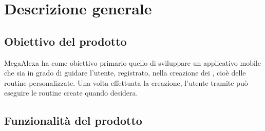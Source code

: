 \section{Descrizione generale}


\subsection{Obiettivo del prodotto}
{
    MegaAlexa ha come obiettivo primario quello di sviluppare un applicativo mobile che sia in grado di guidare l'utente, registrato, nella 
    creazione dei , cioè delle routine personalizzate. Una volta effettuata la creazione, l'utente tramite  può 
    eseguire le routine create quando desidera.
}

\subsection{Funzionalità del prodotto}
